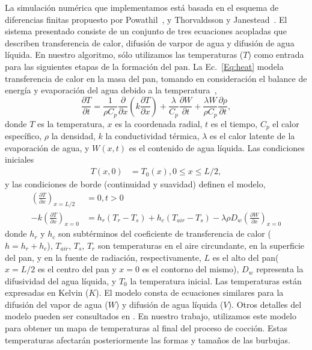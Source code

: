 \documentclass[spanish,a4paper,openright,11pt]{book}
\begin{document}
La simulación numérica que implementamos está basada en el esquema de diferencias finitas propuesto por Powathil~\cite{Powathil2004}, y Thorvaldsson y Janestead~\cite{Thorvaldsson1999}. 
El sistema presentado consiste de un conjunto de tres ecuaciones acopladas que describen transferencia de calor, difusión de varpor de agua y difusión de agua líquida.
En nuestro algoritmo, sólo utilizamos las temperaturas ($T$) como entrada para las siguientes etapas de la formación del pan.
La Ec.~\ref{Eq:heat} modela transferencia de calor en la masa del pan, tomando en consideración el balance de energía y evaporación del agua debido a la temperatura~\cite{Thorvaldsson1999},
%
\begin{equation}
\label{Eq:heat}
\frac{\partial T}{\partial t} = \frac{1}{\rho C_{p}} \frac{\partial}{\partial x} \left ( k \frac{\partial T}{\partial x} \right ) + \frac{\lambda}{C_{p}} \frac{\partial W}{\partial t}+\frac{\lambda W}{ \rho C_{p} }\frac{\partial \rho}{\partial t},
\end{equation}
%
donde $T$ es la temperatura, $x$ es la coordenada radial, $t$ es el tiempo, $C_{p}$ el calor específico, $\rho$ la densidad, $k$ la conductividad térmica, $\lambda$ es el calor latente de la evaporación de agua, y $W(x,t)$ es el contenido de agua líquida. 
Las condiciones iniciales
%
\begin{align*}
T(x,0) &= T_{0}(x), 0\le x \le L/2,
\end{align*}
y las condiciones de borde (continuidad y suavidad) definen el modelo,
\begin{align*}
\left ( \frac{\partial T}{\partial x} \right )_{x=L/2} &= 0 , t > 0 \\
-k \left ( \frac{\partial T}{\partial x} \right )_{x=0} &= h_{r}(T_{r}-T_{s}) + h_{c}(T_{air}-T_{s}) - \lambda \rho D_{w} \left (\frac{\partial W}{\partial x} \right )_{x=0}
\end{align*}
%
donde $h_{r}$ y $h_{c}$ son subtérminos del coeficiente de transferencia de calor ($h = h_{r}+h_{c}$), $T_{air}$, $T_{s}$, $T_{r}$ son temperaturas en el aire circundante, en la superficie del pan, y en la fuente de radiación, respectivamente, $L$ es el alto del pan($x = L/2$ es el centro del pan y $x = 0$ es el contorno del mismo), $D_{w}$ representa la difusividad del agua líquida, y $T_{0}$ la temperatura inicial. 
Las temperaturas están expresadas en Kelvin ($K$). 
El modelo consta de ecuaciones similares para la difusión del vapor de agua ($W$) y difusión de agua líquida ($V$).
Otros detalles del modelo pueden ser consultados en \cite{Thorvaldsson1999}.
En nuestro trabajo, utilizamos este modelo para obtener un mapa de temperaturas al final del proceso de cocción.
Estas temperaturas afectarán posteriormente las formas y tamaños de las burbujas.
\end{document}
